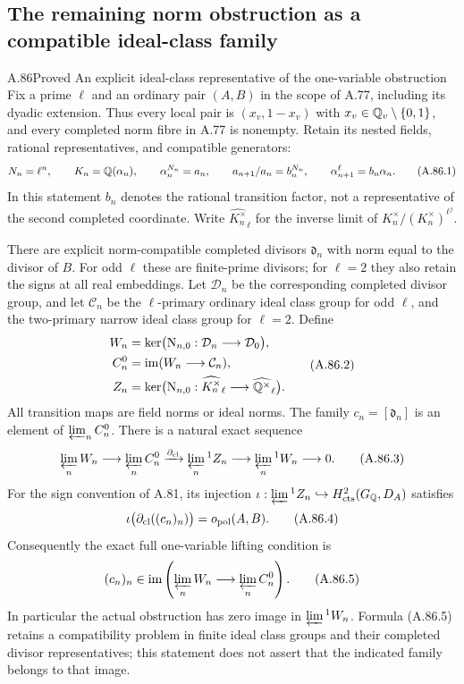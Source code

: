 \subsection{The remaining norm obstruction as a compatible ideal-class family}

\begin{statement}{A.86}{Proved}
{An explicit ideal-class representative of the one-variable obstruction}
Fix a prime $\ell$ and an ordinary pair $(A,B)$ in the scope of
A.77, including its dyadic extension.  Thus every local pair is
$(x_v,1-x_v)$ with $x_v\in\mathbb Q_v\setminus\{0,1\}$, and every
completed norm fibre in A.77 is nonempty.  Retain its nested
fields, rational representatives, and compatible generators:
\[
 N_n=\ell^n,\qquad K_n=\mathbb Q(\alpha_n),\qquad
 \alpha_n^{N_n}=a_n,\qquad
 a_{n+1}/a_n=b_n^{N_n},\qquad
 \alpha_{n+1}^{\ell}=b_n\alpha_n.
 \tag{A.86.1}
\]
In this statement $b_n$ denotes the rational transition factor,
not a representative of the second completed coordinate.
Write $\widehat{K_n^\times}_{\ell}$ for the inverse limit of
$K_n^\times/(K_n^\times)^{\ell^j}$.

There are explicit norm-compatible completed divisors
$\mathfrak d_n$ with norm equal to the divisor of $B$.
For odd $\ell$ these are finite-prime divisors; for $\ell=2$
they also retain the signs at all real embeddings.
Let $\mathcal D_n$ be the corresponding completed divisor group,
and let $\mathcal C_n$ be the $\ell$-primary ordinary ideal class
group for odd $\ell$, and the two-primary narrow ideal class
group for $\ell=2$.  Define
\[
\begin{aligned}
 W_n&=\ker\bigl(\mathrm N_{n,0}:\mathcal D_n\longrightarrow
                                      \mathcal D_0\bigr),\\
 C_n^0&=\operatorname{im}(W_n\longrightarrow\mathcal C_n),\\
 Z_n&=\ker\bigl(\mathrm N_{n,0}:\widehat{K_n^\times}_{\ell}
                         \longrightarrow\widehat{\mathbb Q^\times}_{\ell}\bigr).
\end{aligned}
 \tag{A.86.2}
\]
All transition maps are field norms or ideal norms.  The family
$c_n=[\mathfrak d_n]$ is an element of $\varprojlim_n C_n^0$.
There is a natural exact sequence
\[
 \varprojlim_n W_n\longrightarrow\varprojlim_n C_n^0
 \xrightarrow{\partial_{\rm cl}}\varprojlim_n{}^1 Z_n
 \longrightarrow\varprojlim_n{}^1 W_n\longrightarrow0.
 \tag{A.86.3}
\]
For the sign convention of A.81, its injection
$\iota:\varprojlim{}^1 Z_n\hookrightarrow
H^2_{\rm cts}(G_\mathbb Q,D_A)$ satisfies
\[
             \iota\bigl(\partial_{\rm cl}((c_n)_n)\bigr)
                             =o_{\rm pol}(A,B).
 \tag{A.86.4}
\]
Consequently the exact full one-variable lifting condition is
\[
 (c_n)_n\in
 \operatorname{im}\left(\varprojlim_n W_n
                              \longrightarrow\varprojlim_n C_n^0\right).
 \tag{A.86.5}
\]
In particular the actual obstruction has zero image in
$\varprojlim{}^1 W_n$.  Formula (A.86.5) retains a compatibility
problem in finite ideal class groups and their completed divisor
representatives; this statement does not assert that the indicated
family belongs to that image.
\end{statement}
